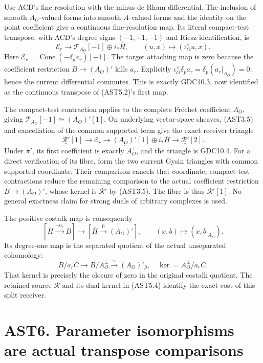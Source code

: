 Use ACD's fine resolution with the minus de Rham differential. The
inclusion of smooth \(A_O\)-valued forms into smooth \(A\)-valued forms
and the identity on the point coefficient give a continuous
fine-resolution map. Its literal compact-test transpose, with ACD's
degree signs \((-1,+1,-1)\) and Riesz identification, is \[
\mathscr E_r\longrightarrow
\mathscr T_{A_O}[-1]\oplus i_*\overline H,
\qquad (u,x)\longmapsto(\iota_O^\vee u,x).
\tag{AST5.3}
\] Here \(\mathscr E_r=\operatorname{Cone}(-\delta_pa_r)[-1]\). The
target attaching map is zero because the coefficient restriction
\(B\to(A_O)'\) kills \(a_r\). Explicitly
\(\iota_O^\vee\delta_pa_r=\delta_p(a_r|_{A_O})=0\); hence the current
differential commutes. This is exactly GDC10.3, now identified as the
continuous transpose of (AST5.2)'s first map.

The compact-test contraction applies to the complete Fréchet coefficient
\(A_O\), giving \(\mathscr T_{A_O}[-1]\simeq\underline{(A_O)'}[1]\). On
underlying vector-space sheaves, (AST3.5) and cancellation of the common
supported term give the exact receiver triangle \[
\boxed{\underline{\mathcal R'}[1]\longrightarrow\mathscr E_r
\longrightarrow\underline{(A_O)'}[1]\oplus i_*\overline H
\longrightarrow\underline{\mathcal R'}[2].}
\tag{AST5.4}
\] Under \(\widetilde\pi'\), its first coefficient is exactly
\(A_O^\perp\), and the triangle is GDC10.4. For a direct verification of
its fibre, form the two current Gysin triangles with common supported
coordinate. Their comparison cancels that coordinate; compact-test
contractions reduce the remaining comparison to the actual coefficient
restriction \(B\to(A_O)'\), whose kernel is \(\mathcal R'\) by (AST3.5).
The fibre is thus \(\underline{\mathcal R'}[1]\). No general exactness
claim for strong duals of arbitrary complexes is used.

The positive costalk map is consequently \[
[\overline H\xrightarrow{+a_r}B]
\longrightarrow[\overline H\xrightarrow{0}(A_O)'],
\qquad(x,b)\longmapsto(x,b|_{A_O}).
\tag{AST5.5}
\] Its degree-one map is the separated quotient of the actual
unseparated cohomology: \[
B/a_rC\longrightarrow B/A_O^\perp\xrightarrow{\sim}(A_O)'_\beta,
\quad
\ker= A_O^\perp/a_rC.
\tag{AST5.6}
\] That kernel is precisely the closure of zero in the original costalk
quotient. The retained source \(\mathcal R\) and its dual kernel in
(AST5.4) identify the exact cost of this split receiver.

\section{AST6. Parameter isomorphisms are actual transpose
comparisons}\label{ast6.-parameter-isomorphisms-are-actual-transpose-comparisons}

